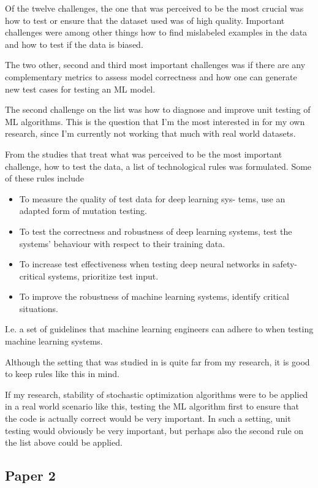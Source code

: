 \documentclass{article}
\begin{document}
Of the twelve challenges, the one that was perceived to be the most crucial was how to test or ensure that the dataset used was of high quality. Important challenges were among other things how to find mislabeled examples in the data and how to test if the data is biased.

The two other, second and third most important challenges was if there are any complementary metrics to assess model correctness and how one can generate new test cases for testing an ML model.

The second challenge on the list was how to diagnose and improve unit testing of ML algorithms. This is the question that I'm the most interested in for my own research, since I'm currently not working that much with real world datasets. 

From the studies that treat what was perceived to be the most important challenge, how to test the data, 
a list of technological rules was formulated. Some of these rules include
\begin{itemize}
    \item To measure the quality of test data for deep learning sys-
tems, use an adapted form of mutation testing.
\item To test the correctness and robustness of deep learning
systems, test the systems’ behaviour with respect to their
training data.
\item To increase test effectiveness when testing deep neural
networks in safety-critical systems, prioritize test input.
\item To improve the robustness of machine learning systems,
identify critical situations.
\end{itemize}
I.e. a set of guidelines that machine learning engineers can adhere to when testing machine learning systems.

Although the setting that was studied in \cite{axis} is quite far from my research, it is good to keep rules like this in mind.

If my research, stability of stochastic optimization algorithms were to be applied in a real world scenario like this, testing the ML algorithm first to ensure that the code is actually correct would be very important. In such a setting, unit testing would obviously be very important, but perhaps also the second rule on the list above could be applied.

\subsection{Paper 2}
\end{document}
